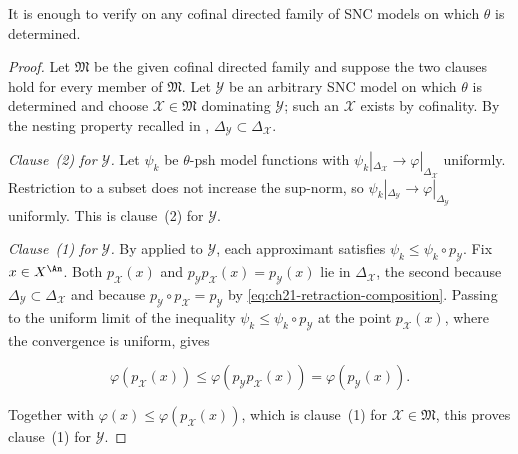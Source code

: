 \begin{proposition}\label{prop:ch21-cofinal-independence}
It is enough to verify  on any cofinal directed family
of SNC models on which \(\theta\) is determined.
\end{proposition}

\begin{proof}
Let \(\mathfrak M\) be the given cofinal directed family and suppose the two
clauses hold for every member of \(\mathfrak M\).  Let \(\mathcal Y\) be an
arbitrary SNC model on which \(\theta\) is determined and choose
\(\mathcal X\in\mathfrak M\) dominating \(\mathcal Y\); such an
\(\mathcal X\) exists by cofinality.  By the nesting property recalled in
, \(\Delta_{\mathcal Y}\subset\Delta_{\mathcal X}\).

\emph{Clause~(2) for \(\mathcal Y\).}  Let \(\psi_k\) be \(\theta\)-psh
model functions with
\(\psi_k|_{\Delta_{\mathcal X}}\to\varphi|_{\Delta_{\mathcal X}}\)
uniformly.  Restriction to a subset does not increase the sup-norm, so
\(\psi_k|_{\Delta_{\mathcal Y}}\to\varphi|_{\Delta_{\mathcal Y}}\)
uniformly.  This is clause~(2) for \(\mathcal Y\).

\emph{Clause~(1) for \(\mathcal Y\).}  By
 applied to \(\mathcal Y\), each
approximant satisfies \(\psi_k\leq\psi_k\circ p_{\mathcal Y}\).  Fix
\(x\in X^{\An}\).  Both \(p_{\mathcal X}(x)\) and
\(p_{\mathcal Y}p_{\mathcal X}(x)=p_{\mathcal Y}(x)\) lie in
\(\Delta_{\mathcal X}\), the second because
\(\Delta_{\mathcal Y}\subset\Delta_{\mathcal X}\) and because
\(p_{\mathcal Y}\circ p_{\mathcal X}=p_{\mathcal Y}\) by
\eqref{eq:ch21-retraction-composition}.  Passing to the uniform limit of the
inequality \(\psi_k\leq\psi_k\circ p_{\mathcal Y}\) at the point
\(p_{\mathcal X}(x)\), where the convergence is uniform, gives

\begin{equation}
\label{eq:ch21-cofinal-retractions}
 \varphi(p_{\mathcal X}(x))
 \leq
 \varphi(p_{\mathcal Y}p_{\mathcal X}(x))
 =\varphi(p_{\mathcal Y}(x)).
\end{equation}

Together with \(\varphi(x)\leq\varphi(p_{\mathcal X}(x))\), which is
clause~(1) for \(\mathcal X\in\mathfrak M\), this proves
clause~(1) for \(\mathcal Y\).
\end{proof}

